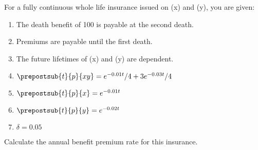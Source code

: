 For a fully continuous whole life insurance issued on (x) and (y), you are given:
\begin{enumerate}
\item The death benefit of 100 is payable at the second death.
\item Premiums are payable until the first death.
\item The future lifetimes of (x) and (y) are dependent.
\item $\prepostsub{t}{p}{xy} = e^{-0.01t}/4 + 3e^{-0.03t}/4$
\item $\prepostsub{t}{p}{x} = e^{-0.01t}$
\item $\prepostsub{t}{p}{y} = e^{-0.02t}$
\item $\delta = 0.05$
\end{enumerate}
Calculate the annual benefit premium rate for this insurance.

